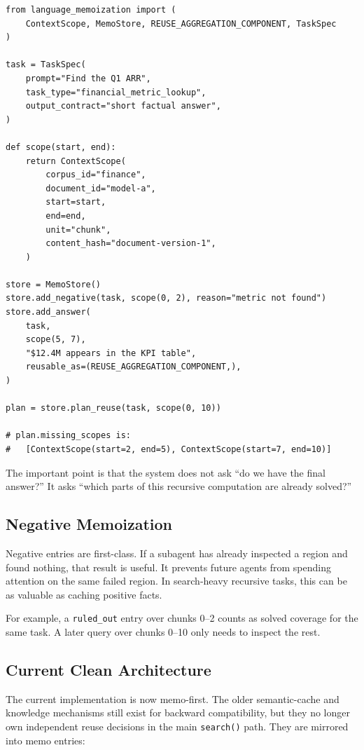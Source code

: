 \documentclass[11pt]{article}
\begin{document}
\begin{verbatim}
from language_memoization import (
    ContextScope, MemoStore, REUSE_AGGREGATION_COMPONENT, TaskSpec
)

task = TaskSpec(
    prompt="Find the Q1 ARR",
    task_type="financial_metric_lookup",
    output_contract="short factual answer",
)

def scope(start, end):
    return ContextScope(
        corpus_id="finance",
        document_id="model-a",
        start=start,
        end=end,
        unit="chunk",
        content_hash="document-version-1",
    )

store = MemoStore()
store.add_negative(task, scope(0, 2), reason="metric not found")
store.add_answer(
    task,
    scope(5, 7),
    "$12.4M appears in the KPI table",
    reusable_as=(REUSE_AGGREGATION_COMPONENT,),
)

plan = store.plan_reuse(task, scope(0, 10))

# plan.missing_scopes is:
#   [ContextScope(start=2, end=5), ContextScope(start=7, end=10)]
\end{verbatim}

The important point is that the system does not ask ``do we have the final
answer?'' It asks ``which parts of this recursive computation are already
solved?''

\subsection{Negative Memoization}

Negative entries are first-class. If a subagent has already inspected a region
and found nothing, that result is useful. It prevents future agents from
spending attention on the same failed region. In search-heavy recursive tasks,
this can be as valuable as caching positive facts.

For example, a \texttt{ruled\_out} entry over chunks 0--2 counts as solved
coverage for the same task. A later query over chunks 0--10 only needs to
inspect the rest.

\subsection{Current Clean Architecture}

The current implementation is now memo-first. The older semantic-cache and
knowledge mechanisms still exist for backward compatibility, but they no longer
own independent reuse decisions in the main \texttt{search()} path. They are
mirrored into memo entries:
\end{document}
